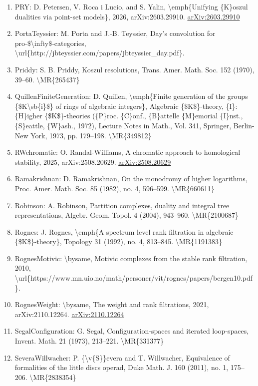 \documentclass[11pt]{article}
\begin{document}
\begin{enumerate}[leftmargin=*]
  \item PRY: D. Petersen, V. Roca i Lucio, and S. Yalin, \textbackslash{}emph\{Unifying \{K\}oszul dualities via point-set models\}, 2026, arXiv:2603.29910. \href{https://arxiv.org/abs/2603.29910}{arXiv:2603.29910}
  \item PortaTeyssier: M. Porta and J.-B. Teyssier, Day's convolution for pro-\$\textbackslash{}infty\$-categories, \textbackslash{}url\{http://jbteyssier.com/papers/jbteyssier\_day.pdf\}.
  \item Priddy: S. B. Priddy, Koszul resolutions, Trans. Amer. Math. Soc. 152 (1970), 39--60. \textbackslash{}MR\{265437\}
  \item QuillenFiniteGeneration: D. Quillen, \textbackslash{}emph\{Finite generation of the groups \{\$K\textbackslash{}sb\{i\}\$\} of rings of algebraic integers\}, Algebraic \{\$K\$\}-theory, \{I\}: \{H\}igher \{\$K\$\}-theories (\{P\}roc. \{C\}onf., \{B\}attelle \{M\}emorial \{I\}nst., \{S\}eattle, \{W\}ash., 1972), Lecture Notes in Math., Vol. 341, Springer, Berlin-New York, 1973, pp. 179--198. \textbackslash{}MR\{349812\}
  \item RWchromatic: O. Randal-Williams, A chromatic approach to homological stability, 2025, arXiv:2508.20629. \href{https://arxiv.org/abs/2508.20629}{arXiv:2508.20629}
  \item Ramakrishnan: D. Ramakrishnan, On the monodromy of higher logarithms, Proc. Amer. Math. Soc. 85 (1982), no. 4, 596--599. \textbackslash{}MR\{660611\}
  \item Robinson: A. Robinson, Partition complexes, duality and integral tree representations, Algebr. Geom. Topol. 4 (2004), 943--960. \textbackslash{}MR\{2100687\}
  \item Rognes: J. Rognes, \textbackslash{}emph\{A spectrum level rank filtration in algebraic \{\$K\$\}-theory\}, Topology 31 (1992), no. 4, 813--845. \textbackslash{}MR\{1191383\}
  \item RognesMotivic: \textbackslash{}bysame, Motivic complexes from the stable rank filtration, 2010, \textbackslash{}url\{https://www.mn.uio.no/math/personer/vit/rognes/papers/bergen10.pdf\}.
  \item RognesWeight: \textbackslash{}bysame, The weight and rank filtrations, 2021, arXiv:2110.12264. \href{https://arxiv.org/abs/2110.12264}{arXiv:2110.12264}
  \item SegalConfiguration: G. Segal, Configuration-spaces and iterated loop-spaces, Invent. Math. 21 (1973), 213--221. \textbackslash{}MR\{331377\}
  \item SeveraWillwacher: P. \{\textbackslash{}v\{S\}\}evera and T. Willwacher, Equivalence of formalities of the little discs operad, Duke Math. J. 160 (2011), no. 1, 175--206. \textbackslash{}MR\{2838354\}

\end{enumerate}
\end{document}

